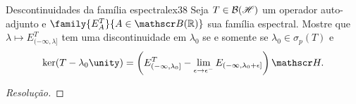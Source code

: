 \begin{exercício}{Descontinuidades da família espectral}{ex38}
  Seja \(T\in\mathcal{B}(\mathscr{H})\) um operador auto-adjunto e \(\family{E_A^T}{A \in \borel(\mathbb{R})}\) sua família espectral. Mostre que \(\lambda \mapsto E^T_{(-\infty, \lambda]}\) tem uma discontinuidade em \(\lambda_0\) se e somente se \(\lambda_0 \in \sigma_p(T)\) e
  \begin{equation*}
    \ker(T - \lambda_0\unity) = \left(E^T_{(-\infty, \lambda_0]} - \lim_{\epsilon\to \epsilon^{-}}{E_{(-\infty, \lambda_0 + \epsilon]}}\right)\hilbert.
  \end{equation*}
\end{exercício}
\begin{proof}[Resolução]

\end{proof}
